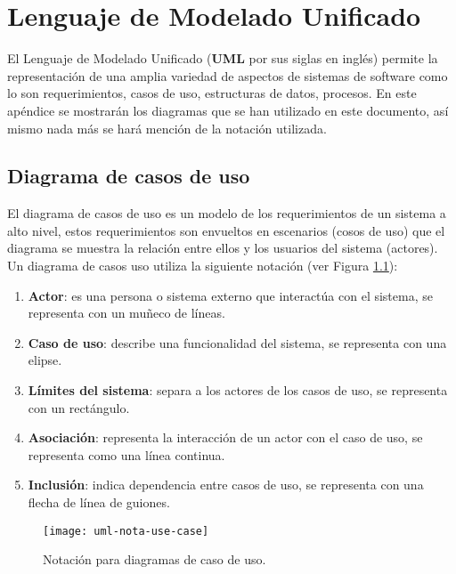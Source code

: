 \chapter{Lenguaje de Modelado Unificado}

El Lenguaje de Modelado Unificado (\textbf{UML} por sus siglas en inglés) permite la representación de una amplia variedad de aspectos de sistemas de software como lo son requerimientos, casos de uso, estructuras de datos, procesos\cite{UMLClassroom}. En este apéndice se mostrarán los diagramas que se han utilizado en este documento, así mismo nada más se hará mención de la notación utilizada.

\section{Diagrama de casos de uso}\label{sec-uml-cu}
El diagrama de casos de uso es un modelo de los requerimientos de un sistema a alto nivel, estos requerimientos son envueltos en escenarios (cosos de uso) que el diagrama se muestra la relación entre ellos y los usuarios del sistema (actores)\cite{UMLClassroom, SoftwareEngineeringUML}.\\
Un diagrama de casos uso utiliza la siguiente notación\cite{UMLClassroom, SoftwareEngineeringUML} (ver Figura \ref{fig:uml-nota-use-case}):
\begin{enumerate}
  \item \textbf{Actor}: es una persona o sistema externo que interactúa con el sistema, se representa con un muñeco de líneas.
  \item \textbf{Caso de uso}: describe una funcionalidad del sistema, se representa con una elipse.
  \item \textbf{Límites del sistema}: separa a los actores de los casos de uso, se representa con un rectángulo.
  \item \textbf{Asociación}: representa la interacción de un actor con el caso de uso, se representa como una línea continua.
  \item \textbf{Inclusión}: indica dependencia entre casos de uso, se representa con una flecha de línea de guiones.
\end{enumerate}

\begin{figure}[h]
  \centering
  \texttt{[image: uml-nota-use-case]}
  \caption{Notación para diagramas de caso de uso\cite{SoftwareEngineeringUML}.}
  \label{fig:uml-nota-use-case}
\end{figure}


